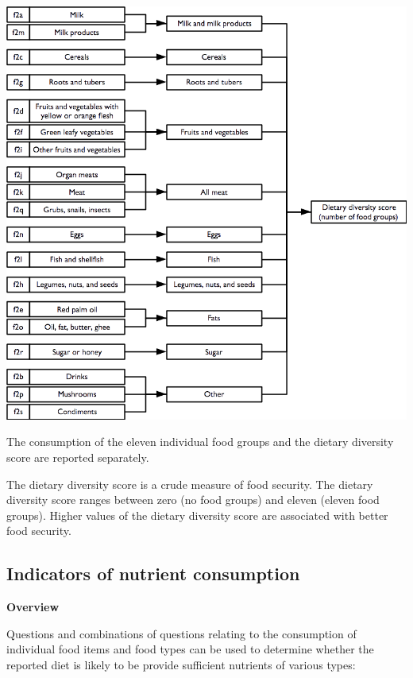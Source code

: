 \documentclass[12pt,a4paper]{book}
\theoremstyle{definition}
\theoremstyle{definition}
\theoremstyle{definition}
\theoremstyle{remark}
\begin{document}
\begin{center}\includegraphics[width=800pt]{figures/indicators06} \end{center}

The consumption of the eleven individual food groups and the dietary
diversity score are reported separately.

The dietary diversity score is a crude measure of food security. The
dietary diversity score ranges between zero (no food groups) and eleven
(eleven food groups). Higher values of the dietary diversity score are
associated with better food security.

\hypertarget{indicators-of-nutrient-consumption}{%
\subsection{Indicators of nutrient
consumption}\label{indicators-of-nutrient-consumption}}

\textbf{Overview}

Questions and combinations of questions relating to the consumption of
individual food items and food types can be used to determine whether
the reported diet is likely to be provide sufficient nutrients of
various types:
\end{document}

